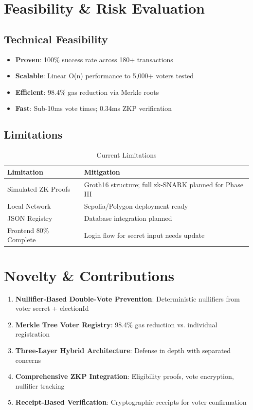 \documentclass[conference]{IEEEtran}
\begin{document}
\section{Feasibility \& Risk Evaluation}

\subsection{Technical Feasibility}
\begin{itemize}
    \item \textbf{Proven}: 100\% success rate across 180+ transactions
    \item \textbf{Scalable}: Linear O(n) performance to 5,000+ voters tested
    \item \textbf{Efficient}: 98.4\% gas reduction via Merkle roots
    \item \textbf{Fast}: Sub-10ms vote times; 0.34ms ZKP verification
\end{itemize}

\subsection{Limitations}

\begin{table}[htbp]
\caption{Current Limitations}
\centering
\begin{tabular}{|p{2.5cm}|p{5cm}|}
\hline
\textbf{Limitation} & \textbf{Mitigation} \\
\hline
Simulated ZK Proofs & Groth16 structure; full zk-SNARK planned for Phase III \\
\hline
Local Network & Sepolia/Polygon deployment ready \\
\hline
JSON Registry & Database integration planned \\
\hline
Frontend 80\% Complete & Login flow for secret input needs update \\
\hline
\end{tabular}
\end{table}

\section{Novelty \& Contributions}

\begin{enumerate}
    \item \textbf{Nullifier-Based Double-Vote Prevention}: Deterministic nullifiers from voter secret + electionId
    \item \textbf{Merkle Tree Voter Registry}: 98.4\% gas reduction vs. individual registration
    \item \textbf{Three-Layer Hybrid Architecture}: Defense in depth with separated concerns
    \item \textbf{Comprehensive ZKP Integration}: Eligibility proofs, vote encryption, nullifier tracking
    \item \textbf{Receipt-Based Verification}: Cryptographic receipts for voter confirmation
\end{enumerate}
\end{document}

